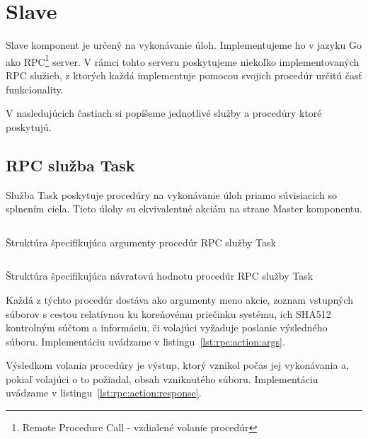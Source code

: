 
\section{Slave}
\label{sec:slave}

Slave komponent je určený na vykonávanie úloh. Implementujeme ho v jazyku Go
ako RPC\footnote{Remote Procedure Call - vzdialené volanie procedúr} server.
V rámci tohto serveru poskytujeme niekoľko implementovaných RPC služieb,
z ktorých každá implementuje pomocou svojich procedúr určitú časť funkcionality.

V nasledujúcich častiach si popíšeme jednotlivé služby a procedúry ktoré
poskytujú.

\subsection{RPC služba Task}
\label{sec:slave:rpc:action}

Služba Task poskytuje procedúry na vykonávanie úloh priamo súvisiacich so
splnením cieľa. Tieto úlohy su ekvivalentné akciám na strane Master komponentu.

\begin{listing}[H]
  \inputminted[frame=lines,framesep=2mm,linenos,fontsize=\scriptsize,firstline=8,lastline=12]{go}{/home/pepol/src/imterra/forge/proto/proto.go}
  \caption[Argumenty služby Task]{Štruktúra špecifikujúca argumenty procedúr RPC služby Task}
  \label{lst:rpc:action:args}
\end{listing}

\begin{listing}[H]
  \inputminted[frame=lines,framesep=2mm,linenos,fontsize=\scriptsize,firstline=14,lastline=17]{go}{/home/pepol/src/imterra/forge/proto/proto.go}
  \caption[Návratová hodnota služby Task]{Štruktúra špecifikujúca návratovú hodnotu procedúr RPC služby Task}
  \label{lst:rpc:action:response}
\end{listing}

Každá z týchto procedúr dostáva ako argumenty meno akcie, zoznam vstupných súborov
s cestou relatívnou ku koreňovému priečinku systému, ich SHA512 kontrolným súčtom a informáciu, či volajúci
vyžaduje poslanie výsledného súboru. Implementáciu uvádzame v listingu~\ref{lst:rpc:action:args}.

Výsledkom volania procedúry je výstup, ktorý vznikol počas jej vykonávania a,
pokiaľ volajúci o to požiadal, obsah vzniknutého súboru. Implementáciu uvádzame
v listingu~\ref{lst:rpc:action:response}.

